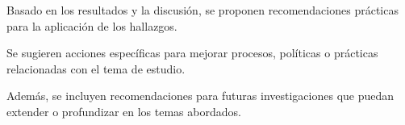 \label{sec:recomendaciones}

Basado en los resultados y la discusión, se proponen recomendaciones prácticas para la aplicación de los hallazgos.

Se sugieren acciones específicas para mejorar procesos, políticas o prácticas relacionadas con el tema de estudio.

Además, se incluyen recomendaciones para futuras investigaciones que puedan extender o profundizar en los temas abordados.